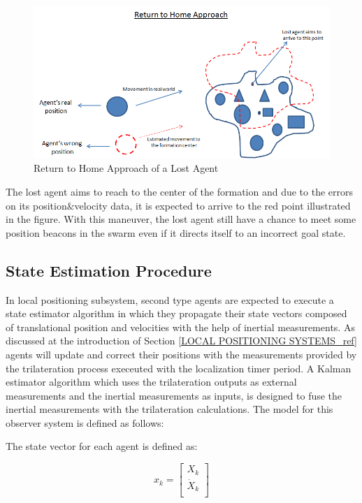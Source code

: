 \begin{figure}[H]
\caption{Return to Home Approach of a Lost Agent} \label{return_home_ref}
\centering
\includegraphics[scale = 0.60]{return_home}
\end{figure}
	
The lost agent aims to reach to the center of the formation and due to the errors on its position$\&$velocity data, it is expected to arrive to the red point illustrated in the figure. With this maneuver, the lost agent still have a chance to meet some position beacons in the swarm even if it directs itself to an incorrect goal state.
	
\subsection{State Estimation Procedure} \label{StateEstimationref}
In local positioning subsystem, second type agents are expected to execute a state estimator algorithm in which they propagate their state vectors composed of translational position and velocities with the help of inertial measurements. As discussed at the introduction of Section \ref{LOCAL POSITIONING SYSTEMS_ref} agents will update and correct their positions with the measurements provided by the trilateration process execeuted with the localization timer period. A Kalman estimator algorithm which uses the trilateration outputs as external measurements and the inertial measurements as inputs, is designed to fuse the inertial measurements with the trilateration calculations. The model for this observer system is defined as follows:
	
The state vector for each agent is defined as:

\begin{equation}
x_k = \begin{bmatrix}
X_k \\
\dot{X}_k\\
\end{bmatrix}
\end{equation}
	
